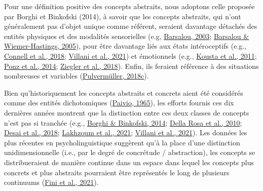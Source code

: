 \documentclass[
  a4paper,12pt,twoside,onecolumn,openright,final,oldfontcommands]{memoir}
\begin{document}
Pour une définition positive des concepts abstraits, nous adoptons celle proposée par Borghi et Binkofski (2014), à savoir que les concepts abstraits, qui n'ont généralement pas d'objet unique comme référent, seraient davantage détachés des entités physiques et des modalités sensorielles (e.g, \protect\hyperlink{ref-barsalou_abstraction_2003}{Barsalou, 2003}; \protect\hyperlink{ref-pecher_situating_2005}{Barsalou \& Wiemer-Hastings, 2005}), pour être davantage liés aux états intéroceptifs (e.g., \protect\hyperlink{ref-connell_interoception_2018}{Connell et al., 2018}; \protect\hyperlink{ref-villani_sensorimotor_2021}{Villani et al., 2021}) et émotionnels (e.g., \protect\hyperlink{ref-kousta_representation_2011}{Kousta et al., 2011}; \protect\hyperlink{ref-ponz_emotion_2014}{Ponz et al., 2014}; \protect\hyperlink{ref-ziegler_words_2018}{Ziegler et al., 2018}). Enfin, ils feraient référence à des situations nombreuses et variables (\protect\hyperlink{ref-pulvermuller_case_2018}{Pulvermüller, 2018c}).

Bien qu'historiquement les concepts abstraits et concrets aient été considérés comme des entités dichotomiques (\protect\hyperlink{ref-paivio_abstractness_1965}{Paivio, 1965}), les efforts fournis ces dix dernières années montrent que la distinction entre ces deux classes de concepts n'est pas si tranchée (e.g., \protect\hyperlink{ref-borghi_words_2014}{Borghi \& Binkofski, 2014}; \protect\hyperlink{ref-della_rosa_beyond_2010}{Della Rosa et al., 2010}; \protect\hyperlink{ref-desai_multifaceted_2018}{Desai et al., 2018}; \protect\hyperlink{ref-lakhzoum_semantic_2021}{Lakhzoum et al., 2021}; \protect\hyperlink{ref-villani_sensorimotor_2021}{Villani et al., 2021}). Les données les plus récentes en psycholinguistique suggèrent qu'à la place d'une distinction unidimensionnelle (i.e., par le degré de concrétude / abstraction), les concepts se distribueraient de manière continue dans un espace dans lequel les concepts plus concrets et plus abstraits pourraient être représentés le long de plusieurs continuums (\protect\hyperlink{ref-fini_articulatory_2021}{Fini et al., 2021}).
\end{document}
